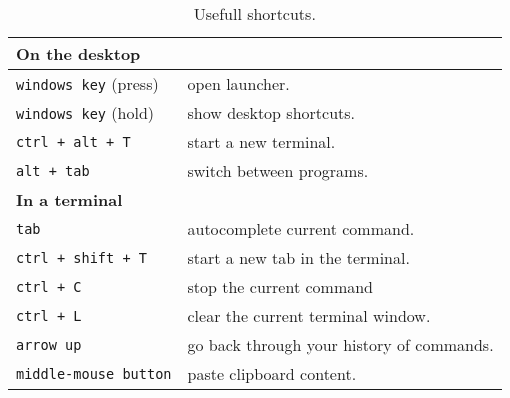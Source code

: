 \documentclass[11pt,a4paper]{article}
\begin{document}
\begin{table}[!ht]
	\centering
	\begin{tabular}{p{5cm}p{10cm}}
		\toprule[1pt]
		\textbf{On the desktop} & \\
		\midrule
		\texttt{windows key} (press) & open launcher.\\
		\texttt{windows key} (hold) & show desktop shortcuts.\\
		\texttt{ctrl + alt + T } & start a new terminal.\\
		\texttt{alt + tab} & switch between programs.\\
		\midrule
		\textbf{In a terminal} & \\
		\midrule
		\texttt{tab} & autocomplete current command.\\
		\texttt{ctrl + shift + T} & start a new tab in the terminal.\\
		\texttt{ctrl + C} & stop the current command\\
		\texttt{ctrl + L} & clear the current terminal window.\\
		\texttt{arrow up} & go back through your history of commands.\\
		\texttt{middle-mouse button} & paste clipboard content.\\
		\bottomrule[1pt]
	\end{tabular}
	\caption{Usefull shortcuts.}
\end{table}
\end{document}
